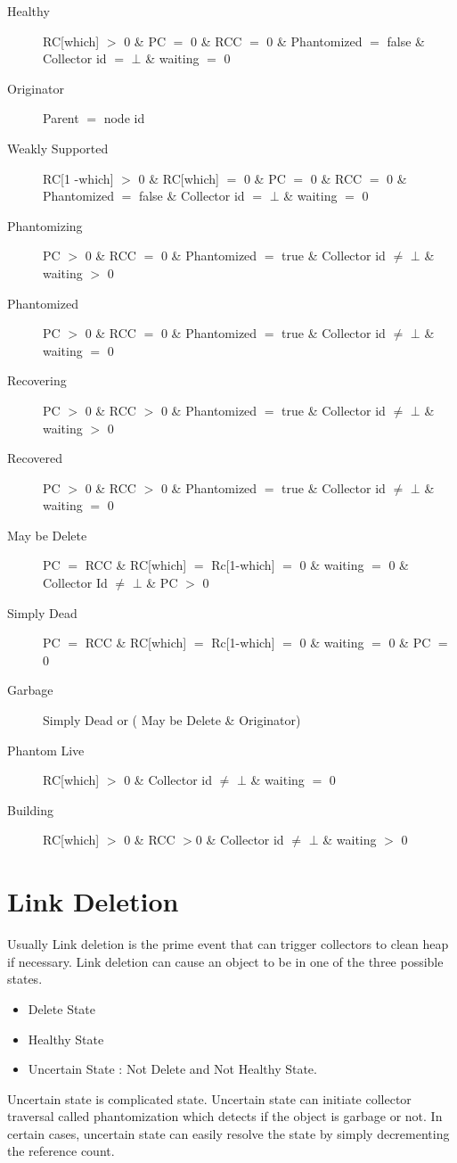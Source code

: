 \documentclass{article}
\begin{document}
\begin{description}
  \item[Healthy] RC[which] $>$ 0 \& PC $=$ 0 \& RCC $=$ 0 \& Phantomized $=$ false \& Collector id $=$ $\bot$ \& waiting $=$ 0
  \item[Originator] Parent $=$ node id 
  \item[Weakly Supported] RC[1 -which] $>$ 0 \& RC[which] $=$ 0 \& PC $=$ 0 \& RCC $=$ 0 \& Phantomized $=$ false \& Collector id $=$ $\bot$ \& waiting $=$ 0
  \item[Phantomizing] PC $>$ 0 \& RCC $=$ 0 \& Phantomized $=$ true \& Collector id $\neq$ $\bot$ \& waiting $>$ 0
  \item[Phantomized] PC $>$ 0 \& RCC $=$ 0 \& Phantomized $=$ true \& Collector id $\neq$ $\bot$ \& waiting $=$ 0
   \item[Recovering] PC $>$ 0 \& RCC $>$ 0 \& Phantomized $=$ true \& Collector id $\neq$ $\bot$ \& waiting $>$ 0
   \item[Recovered] PC $>$ 0 \& RCC $>$ 0 \& Phantomized $=$ true \& Collector id $\neq$ $\bot$ \& waiting $=$ 0
  \item[May be Delete] PC $=$ RCC \& RC[which] $=$ Rc[1-which] $=$ 0 \& waiting $=$ 0 \& Collector Id $\neq$ $\bot$ \& PC $>$ 0
  	\item [Simply Dead] PC $=$ RCC \& RC[which] $=$ Rc[1-which] $=$ 0 \& waiting $=$ 0 \& PC $=$ 0 
  	\item [Garbage] Simply Dead or  ( May be Delete \& Originator)
  \item[Phantom Live] RC[which] $>$ 0 \& Collector id $\neq$ $\bot$ \& waiting $=$ 0
   \item[Building] RC[which] $>$ 0 \& RCC $>$0 \& Collector id $\neq$ $\bot$ \& waiting $>$ 0

\end{description}
\section{Link Deletion}
	Usually Link deletion is the prime event that can trigger collectors to clean heap if necessary. Link deletion can cause an object to be in one of the three possible states. 
\begin{itemize}
  \item Delete State
  \item Healthy State
  \item Uncertain State : Not Delete and Not Healthy State.
\end{itemize}
	Uncertain state is complicated state. Uncertain state can initiate collector traversal called phantomization which detects if the object is garbage or not. In certain cases, uncertain state can easily resolve the state by simply decrementing the reference count. 
\end{document}
